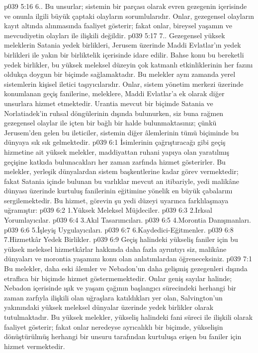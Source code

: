 \vs p039 5:16 6.\bibnobreakspace {}. Bu unsurlar; sistemin bir parçası olarak evren gezegenin içerisinde ve onunla ilgili büyük çaptaki olayların sorumlularıdır. Onlar, gezegensel olayların kayıt altında alınmasında faaliyet gösterir; fakat onlar, bireysel yaşamın ve mevcudiyetin olayları ile ilişkili değildir.
\vs p039 5:17 7.\bibnobreakspace {}. Gezegensel yüksek meleklerin Satania yedek birlikleri, Jerusem üzerinde Maddi Evlatlar’ın yedek birlikleri ile yakın bir birliktelik içerisinde idare edilir. Bahse konu bu bereketli yedek birlikler, bu yüksek meleksel düzeyin çok katmanlı etkinliklerinin her fazını oldukça doygun bir biçimde sağlamaktadır. Bu melekler aynı zamanda yerel sistemlerin kişisel iletici taşıyıcılarıdır. Onlar, sistem yönetim merkezi üzerinde konumlanan geçiş fanilerine, meleklere, Maddi Evlatlar’a ek olarak diğer unsurlara hizmet etmektedir. Urantia mevcut bir biçimde Satania ve Norlatiadek’in ruhsal döngülerinin dışında bulunurken, siz buna rağmen gezegensel olaylar ile içten bir bağlı bir halde bulunmaktasınız; çünkü Jerusem’den gelen bu ileticiler, sistemin diğer âlemlerinin tümü biçiminde bu dünyaya sık sık gelmektedir.
\vs p039 6:1 İsimlerinin çağrıştıracağı gibi geçiş hizmetine ait yüksek melekler, maddiyattan ruhani yapıya olan yaratılmış geçişine katkıda bulunacakları her zaman zarfında hizmet gösterirler. Bu melekler, yerleşik dünyalardan sistem başkentlerine kadar görev vermektedir; fakat Satania içinde bulunan bu varlıklar mevcut an itibariyle, yedi malikâne dünyası üzerinde kurtuluş fanilerinin eğitimine yönelik en büyük çabalarını sergilemektedir. Bu hizmet, görevin şu yedi düzeyi uyarınca farklılaşmaya uğramıştır:
\vs p039 6:2 1.\bibnobreakspace Yüksek Meleksel Müjdeciler.
\vs p039 6:3 2.\bibnobreakspace Irksal Yorumlayıcılar.
\vs p039 6:4 3.\bibnobreakspace Akıl Tasarımcıları.
\vs p039 6:5 4.\bibnobreakspace Morontia Danışmanları.
\vs p039 6:6 5.\bibnobreakspace İşleyiş Uygulayıcıları.
\vs p039 6:7 6.\bibnobreakspace Kaydedici\hyp{}Eğitmenler.
\vs p039 6:8 7.\bibnobreakspace Hizmetkâr Yedek Birlikler.
\vs p039 6:9 Geçiş halindeki yükseliş faniler için bu yüksek meleksel hizmetkârlar hakkında daha fazla ayrıntıyı siz, malikâne dünyaları ve morontia yaşamını konu olan anlatımlardan öğreneceksiniz.
\vs p039 7:1 Bu melekler, daha eski âlemler ve Nebadon’un daha gelişmiş gezegenleri dışında etraflıca bir biçimde hizmet göstermemektedir. Onlar geniş sayılar halinde; Nebadon içerisinde ışık ve yaşam çağının başlangıcı sürecindeki herhangi bir zaman zarfıyla ilişkili olan uğraşlara katıldıkları yer olan, Salvington’un yakınındaki yüksek meleksel dünyalar üzerinde yedek birlikler olarak tutulmaktadır. Bu yüksek melekler, yükseliş halindeki fani süreci ile ilişkili olarak faaliyet gösterir; fakat onlar neredeyse ayrıcalıklı bir biçimde, yükselişin dönüştürülmüş herhangi bir unsuru tarafından kurtuluşa erişen bu faniler için hizmet vermektedir.
